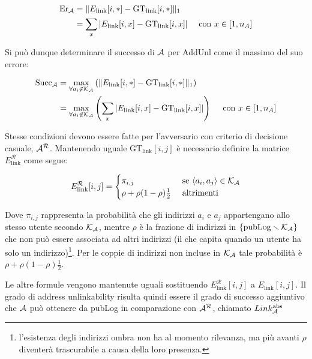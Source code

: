\[ \begin{aligned} \text{Er}_{\mathcal{A}} &= \| E_\text{link} [i, *] - \text{GT}_\text{link} [i,*]\|_1 \\
   &= \sum_x | E_\text{link} [i, x] - \text{GT}_\text{link} [i,x] | \quad \text{ con } x \in [1, n_A]
   \end{aligned}\]

Si può dunque determinare il successo di $\mathcal{A}$ per AddUnl come il massimo del suo errore:

\[ \begin{aligned} \text{Succ}_{\mathcal{A}} &= \max_{\forall a_i \not\in \mathcal{K}_\mathcal{A}} \left(\| E_\text{link} [i, *] - \text{GT}_\text{link} [i,*]\|_1 \right) \\
   &= \max_{\forall a_i \not\in \mathcal{K}_\mathcal{A}}\left(\sum_x | E_\text{link} [i, x] - \text{GT}_\text{link} [i,x] |\right) \quad \text{ con } x \in [1, n_A]
   \end{aligned} \]

Stesse condizioni devono essere fatte per l'avversario con criterio di decisione casuale, $\mathcal{A}^\mathcal{R}$. Mantenendo uguale $\text{GT}_\text{link} [i,j]$ è necessario definire la matrice $E^{\mathcal{R}}_\text{link}$ come segue:

\[E^{\mathcal{R}}_\text{link} [i, j] = \begin{cases} \pi_{i,j} &\text{ se } \langle a_i, a_j \rangle \in \mathcal{K}_\mathcal{A} \\ \rho + \rho(1-\rho)\tfrac{1}{2} &\text{ altrimenti} \end{cases}\]

Dove $\pi_{i,j}$ rappresenta la probabilità che gli indirizzi $a_i$ e $a_j$ appartengano allo stesso utente secondo $\mathcal{K}_\mathcal{A}$, mentre $\rho$ è la frazione di indirizzi in $\{\text{pubLog} \smallsetminus \mathcal{K}_\mathcal{A}\}$ che non può essere associata ad altri indirizzi (il che capita quando un utente ha solo un indirizzo)\footnote{l'esistenza degli indirizzi ombra   non ha al momento rilevanza, ma più avanti $\rho$ diventerà   trascurabile a causa della loro presenza.}. Per le coppie di indirizzi non incluse in $\mathcal{K}_\mathcal{A}$ tale probabilità è $\rho + \rho(1-\rho)\tfrac{1}{2}$.

Le altre formule vengono mantenute uguali sostituendo $E^{\mathcal{R}}_\text{link} [i, j]$ a $E_\text{link} [i, j]$. Il grado di address unlinkability risulta quindi essere il grado di successo aggiuntivo che $\mathcal{A}$ può ottenere da pubLog in comparazione con $\mathcal{A}^\mathcal{R}$, chiamato $Link^{\text{abs}}_{\mathcal{A}}$

